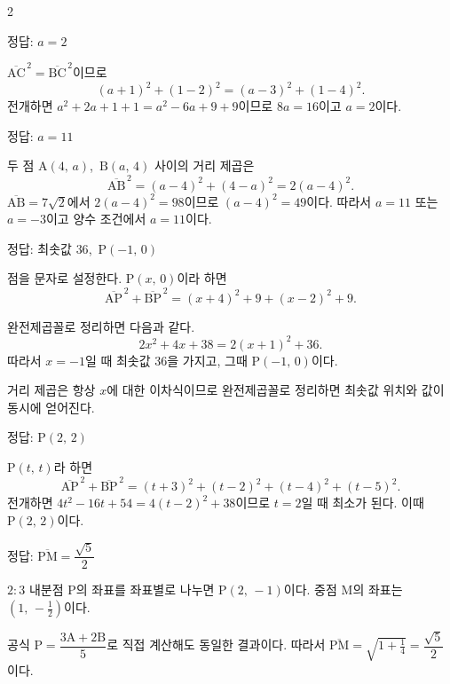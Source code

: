 \documentclass[10pt,fleqn,a4paper]{article}
\begin{document}
\begin{multicols*}{2}

\begin{dmanswerbox}정답: $a=2$\end{dmanswerbox}
$\overline{\mathrm{AC}}^{\,2}=\overline{\mathrm{BC}}^{\,2}$이므로
\[ (a+1)^2 + (1-2)^2 = (a-3)^2 + (1-4)^2. \]
전개하면 $a^2+2a+1+1 = a^2-6a+9+9$이므로 $8a=16$이고 $a=2$이다.

\begin{dmanswerbox}정답: $a=11$\end{dmanswerbox}
두 점 $\mathrm{A}(4,\,a)$,\ $\mathrm{B}(a,\,4)$ 사이의 거리 제곱은
\[ \overline{\mathrm{AB}}^{\,2} = (a-4)^2 + (4-a)^2 = 2(a-4)^2. \]
$\overline{\mathrm{AB}} = 7\sqrt{2}$에서 $2(a-4)^2 = 98$이므로 $(a-4)^2 = 49$이다.
따라서 $a=11$ 또는 $a=-3$이고 양수 조건에서 $a=11$이다.

\begin{dmanswerbox}정답: 최솟값 $36$,\ $\mathrm{P}(-1,\,0)$\end{dmanswerbox}

 점을 문자로 설정한다. $\mathrm{P}(x,\,0)$이라 하면
\[ \overline{\mathrm{AP}}^{\,2}+\overline{\mathrm{BP}}^{\,2} = (x+4)^2+9 + (x-2)^2+9. \]

 완전제곱꼴로 정리하면 다음과 같다.
\[ 2x^2+4x+38 = 2(x+1)^2 + 36. \]
따라서 $x=-1$일 때 최솟값 $36$을 가지고, 그때 $\mathrm{P}(-1,\,0)$이다.

\begin{dmcriticalpoint}
 거리 제곱은 항상 $x$에 대한 이차식이므로 완전제곱꼴로
정리하면 최솟값 위치와 값이 동시에 얻어진다.
\end{dmcriticalpoint}

\begin{dmanswerbox}정답: $\mathrm{P}(2,\,2)$\end{dmanswerbox}
$\mathrm{P}(t,\,t)$라 하면
\[ \overline{\mathrm{AP}}^{\,2}+\overline{\mathrm{BP}}^{\,2} = (t+3)^2+(t-2)^2 + (t-4)^2+(t-5)^2. \]
전개하면 $4t^2 - 16t + 54 = 4(t-2)^2 + 38$이므로 $t=2$일 때 최소가 된다.
이때 $\mathrm{P}(2,\,2)$이다.

\begin{dmanswerbox}정답: $\overline{\mathrm{PM}} = \dfrac{\sqrt{5}}{2}$\end{dmanswerbox}
$2:3$ 내분점 $\mathrm{P}$의 좌표를 좌표별로 나누면 $\mathrm{P}(2,\,-1)$이다.
중점 $\mathrm{M}$의 좌표는 $\left(1,\,-\tfrac{1}{2}\right)$이다.

\dmothersolution
공식 $\mathrm{P}=\dfrac{3\mathrm{A}+2\mathrm{B}}{5}$로 직접 계산해도 동일한 결과이다.
따라서 $\overline{\mathrm{PM}} = \sqrt{1+\tfrac{1}{4}} = \dfrac{\sqrt{5}}{2}$이다.

\end{multicols*}
\end{document}
